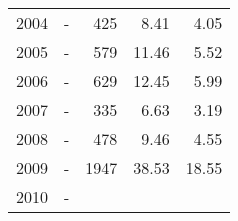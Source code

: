\begin{longtable}{lXrrr}
     2004 &
     \multicolumn{1}{X}{ -  } &


       \num{425} &
       \num[round-mode=places,round-precision=2]{8.41} &
         \num[round-mode=places,round-precision=2]{4.05} \\

     2005 &
     \multicolumn{1}{X}{ -  } &


       \num{579} &
       \num[round-mode=places,round-precision=2]{11.46} &
         \num[round-mode=places,round-precision=2]{5.52} \\

     2006 &
     \multicolumn{1}{X}{ -  } &


       \num{629} &
       \num[round-mode=places,round-precision=2]{12.45} &
         \num[round-mode=places,round-precision=2]{5.99} \\

     2007 &
     \multicolumn{1}{X}{ -  } &


       \num{335} &
       \num[round-mode=places,round-precision=2]{6.63} &
         \num[round-mode=places,round-precision=2]{3.19} \\

     2008 &
     \multicolumn{1}{X}{ -  } &


       \num{478} &
       \num[round-mode=places,round-precision=2]{9.46} &
         \num[round-mode=places,round-precision=2]{4.55} \\

     2009 &
     \multicolumn{1}{X}{ -  } &


       \num{1947} &
       \num[round-mode=places,round-precision=2]{38.53} &
         \num[round-mode=places,round-precision=2]{18.55} \\

     2010 &
     \multicolumn{1}{X}{ -  } &



\end{longtable}
